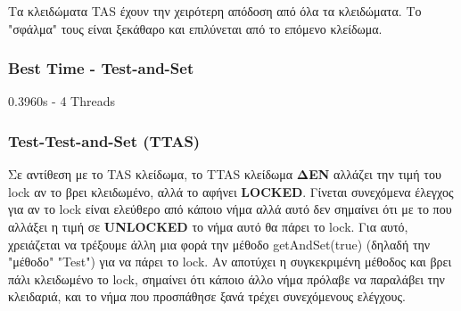 \documentclass[../final_report.tex]{subfiles}
\begin{document}
Τα κλειδώματα TAS έχουν την χειρότερη απόδοση από όλα τα κλειδώματα. Το "σφάλμα" τους είναι 
ξεκάθαρο και επιλύνεται από το επόμενο κλείδωμα.

\subsubsection*{Best Time - Test-and-Set}
0.3960s - 4 Threads


\subsubsection{Test-Test-and-Set (TTAS)}

Σε αντίθεση με το TAS κλείδωμα, το TTAS κλείδωμα \textbf{ΔΕΝ} αλλάζει την τιμή του lock αν το βρει
κλειδωμένο, αλλά το αφήνει \textbf{LOCKED}. Γίνεται συνεχόμενα έλεγχος για αν το lock είναι ελεύθερο
από κάποιο νήμα αλλά αυτό δεν σημαίνει ότι με το που αλλάξει η τιμή σε \textbf{UNLOCKED} το νήμα
αυτό θα πάρει το lock. Για αυτό, χρειάζεται να τρέξουμε άλλη μια φορά την μέθοδο getAndSet(true) (δηλαδή την
"μέθοδο" "Test") για να πάρει το lock. Αν αποτύχει η συγκεκριμένη μέθοδος και βρει πάλι κλειδωμένο το lock, σημαίνει ότι
κάποιο άλλο νήμα πρόλαβε να παραλάβει την κλειδαριά, και το νήμα που προσπάθησε ξανά τρέχει συνεχόμενους 
ελέγχους.
\end{document}

